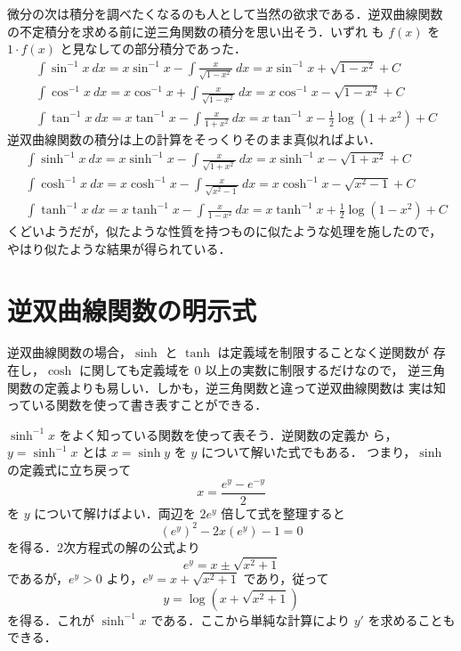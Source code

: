 \documentclass[dvipdfmx,12pt, uplatex]{jsarticle}
\begin{document}
微分の次は積分を調べたくなるのも人として当然の欲求である．逆双曲線関数
の不定積分を求める前に逆三角関数の積分を思い出そう．いずれ
も $f(x)$ を $1 \cdot f(x)$ と見なしての部分積分であった．
\begin{align*}
  & \int \sin^{-1} x \ dx = x \sin^{-1}x - \int \frac{x}{\sqrt{1-x^2}} \ dx 
    = x \sin^{-1} x + \sqrt{1-x^2} +C\\
  & \int \cos^{-1} x \ dx = x \cos^{-1} x + \int \frac{x}{\sqrt{1-x^2}} \ dx
    = x \cos^{-1} x - \sqrt{1-x^2} +C\\
  & \int \tan^{-1} x \ dx = x \tan^{-1} x - \int \frac{x}{1+x^2} \ dx
    = x \tan^{-1} x - \frac{1}{2} \log (1+x^2) +C
\end{align*}
逆双曲線関数の積分は上の計算をそっくりそのまま真似ればよい．
\begin{align*}
  & \int \sinh^{-1} x \ dx = x \sinh^{-1}x - \int \frac{x}{\sqrt{1+x^2}} \ dx
    = x \sinh^{-1} x - \sqrt{1+x^2} +C\\
  & \int \cosh^{-1} x \ dx = x \cosh^{-1}x - \int \frac{x}{\sqrt{x^2-1}} \ dx
    = x \cosh^{-1} x -\sqrt{x^2-1} +C\\
  & \int \tanh^{-1} x \ dx = x \tanh^{-1} x - \int \frac{x}{1-x^2} \ dx
    = x \tanh^{-1} x + \frac{1}{2} \log (1-x^2) +C
\end{align*}
くどいようだが，似たような性質を持つものに似たような処理を施したので，
やはり似たような結果が得られている．

\section{逆双曲線関数の明示式}\label{expl-inv}

逆双曲線関数の場合，$\sinh$ と $\tanh$ は定義域を制限することなく逆関数が
存在し，$\cosh$ に関しても定義域を $0$ 以上の実数に制限するだけなので，
逆三角関数の定義よりも易しい．しかも，逆三角関数と違って逆双曲線関数は
実は知っている関数を使って書き表すことができる．

$\sinh^{-1} x$ をよく知っている関数を使って表そう．逆関数の定義か
ら，$y=\sinh^{-1}x$ とは $x = \sinh y$ を $y$ について解いた式でもある．
つまり，$\sinh$ の定義式に立ち戻って
\[
  x= \frac{e^{y}-e^{-y}}{2}
\]
を $y$ について解けばよい．両辺を $2 e^y$ 倍して式を整理すると
\[
  \left( e^y\right)^2  - 2x \left( e^y\right) - 1 = 0
\]
を得る．2次方程式の解の公式より
\[
e^y = x \pm \sqrt{x^2+1}
\]
であるが，$e^y >0$ より，$e^y = x + \sqrt{x^2+1}$ であり，従って
\[
  y = \log \left( x + \sqrt{x^2+1} \right)
\]
を得る．これが $\sinh^{-1} x$ である．ここから単純な計算により $y'$ を求めることもできる．
\end{document}
